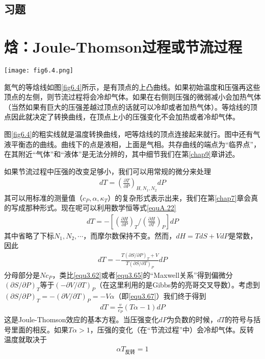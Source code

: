 \subsection*{习题}

\section{焓：Joule-Thomson过程或节流过程}\label{sec6.3}

{
    \centering
    \texttt{[image: fig6.4.png]}
    \label{fig6.4}
}

氮气的等焓线如图\ref{fig6.4}所示，是有顶点的上凸曲线。如果初始温度和压强再这些顶点的左侧，则节流过程将会冷却气体。如果在右侧则压强的微弱减小会加热气体（当然如果有巨大的压强差越过顶点的话就可以冷却或者加热气体）。等焓线的顶点因此就决定了转换曲线，在顶点上小的压强变化不会加热或者冷却气体。%

图\ref{fig6.4}的粗实线就是温度转换曲线，吧等焓线的顶点连接起来就行。图中还有气液平衡态的曲线。曲线下的点是液相，上面是气相。共存曲线的端点为“临界点”，在其附近“气体”和“液体”是无法分辨的，其中细节我们在第\ref{chap9}章讲述。

如果节流过程中压强的改变足够小，我们可以用常规的微分来处理
\begin{align}\label{equ6.38}
dT=\left(\frac{\partial T}{\partial P}\right)_{H, N_1, N_2}dP
\end{align}
其可以用标准的测量值（$c_P, \alpha, \kappa_T$）的复杂形式表示出来，我们在第\ref{chap7}章会真的写成那种形式。现在呢可以利用数学恒等式\eqref{equA.22}
\begin{align}\label{equ6.39}
dT=-\left[\left(\frac{\partial H}{\partial P}\right)_T/\left(\frac{\partial H}{\partial T}\right)_P\right]dP
\end{align}
其中省略了下标$N_1, N_2,\cdots$，而摩尔数保持不变。然而，$dH=TdS+VdP$是常数，因此
\begin{align}\label{equ6.40}
dT=-\frac{T(\partial S/\partial P)_T+V}{T(\partial S/\partial T)_P}dP
\end{align}
分母部分是$Nc_P$，类比\eqref{equ3.62}或者\eqref{equ3.65}的“Maxwell关系”得到偏微分$(\partial S/\partial P)_T$等于$(-\partial V/\partial T)_P$（在这里利用的是Gibbs势的亮哥交叉导数）。考虑到$(\partial S/\partial P)_T=-(\partial V/\partial T)_P=-V\alpha$（即\eqref{equ3.67}）我们终于得到
\begin{align}\label{equ6.41}
dT=\frac{v}{c_P}(T\alpha-1)dP
\end{align}
这是Joule-Thomson效应的基本方程。当压强变化$dP$为负数的时候，$dT$的符号与括号里面的相反。如果$T\alpha>1$，压强的变化（在“节流过程”中）会冷却气体。反转温度就取决于
\begin{align}\label{equ6.42}
\alpha T_{\text{反转}} = 1
\end{align}

